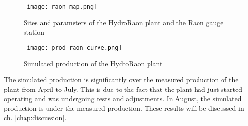 \begin{figure}[H]
\centering
\texttt{[image: raon\_map.png]}
\caption{Sites and parameters of the HydroRaon plant and the Raon gauge station}
\label{raon_map}
\end{figure}

\begin{figure}[H]
\centering
\texttt{[image: prod\_raon\_curve.png]}
\caption{Simulated production of the HydroRaon plant}
\label{prod_raon_curve}
\end{figure}

The simulated production is significantly over the measured production of the plant from April to July. This is due to the fact that the plant had just started operating and was undergoing tests and adjustments. In August, the simulated production is under the measured production. These results will be discussed in ch. \ref{chap:discussion}.

